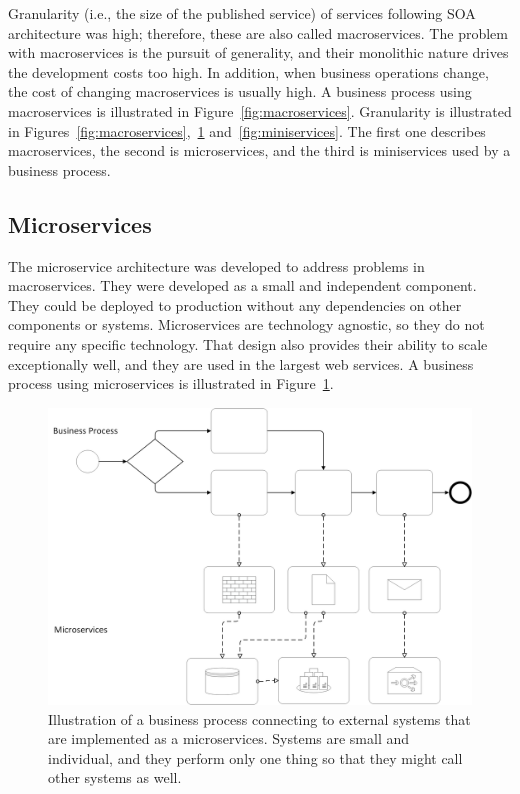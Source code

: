 \documentclass[english, 12pt, a4paper, sci, utf8, a-2b, online, obeyspaces]{aaltothesis}
\begin{document}
Granularity (i.e., the size of the published service) of services following SOA architecture was high; therefore, these are also called macroservices. The problem with macroservices is the pursuit of generality, and their monolithic nature drives the development costs too high. In addition, when business operations change, the cost of changing macroservices is usually high. A business process using macroservices is illustrated in Figure~\ref{fig:macroservices}. Granularity is illustrated in Figures~\ref{fig:macroservices},~\ref{fig:microservices} and~\ref{fig:miniservices}. The first one describes macroservices, the second is microservices, and the third is miniservices used by a business process. 

\subsection{Microservices}
The microservice architecture was developed to address problems in macroservices. They were developed as a small and independent component. They could be deployed to production without any dependencies on other components or systems. Microservices are technology agnostic, so they do not require any specific technology. That design also provides their ability to scale exceptionally well, and they are used in the largest web services. A business process using microservices is illustrated in Figure~\ref{fig:microservices}.

\begin{figure}[htbp]
  \centering
      \includegraphics[width=\textwidth]{pictures/Architecture/Microservices.png}
  \caption{Illustration of a business process connecting to external systems that are implemented as a microservices. Systems are small and individual, and they perform only one thing so that they might call other systems as well.}
  \label{fig:microservices}
\end{figure}
\end{document}

